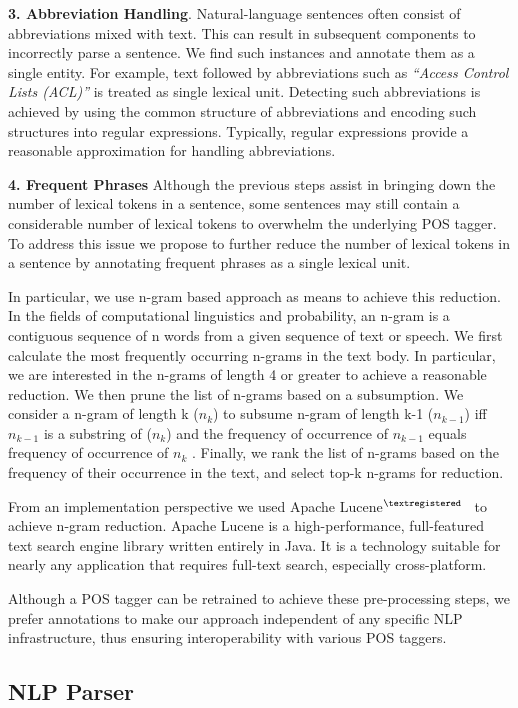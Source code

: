 \textbf{3. Abbreviation Handling}. Natural-language sentences often consist of abbreviations mixed with text. This can result in subsequent components to incorrectly parse a sentence. We find such instances and annotate them as a single entity. For example, text followed by abbreviations such as \textit{``Access Control Lists (ACL)''} is treated as single lexical unit. Detecting such abbreviations is achieved by using the common structure of abbreviations and encoding such structures into regular expressions. Typically, regular expressions provide a reasonable approximation for handling abbreviations. 
	
\textbf{4. Frequent Phrases} Although the previous steps assist in bringing down the number of lexical tokens in a sentence, some sentences may still contain a considerable number of lexical tokens to overwhelm the underlying POS tagger. To address this issue we propose to further reduce the number of lexical tokens in a sentence  by annotating frequent phrases as a single lexical unit.

In particular, we use n-gram based approach as means to achieve this reduction. In the fields of computational linguistics and probability, an n-gram is a contiguous sequence of n words from a given sequence of text or speech. We first calculate the most frequently occurring n-grams in the text body. In particular, we are interested in the n-grams of length 4 or greater to achieve a reasonable reduction. We then prune the list of n-grams based on a subsumption. We consider a n-gram of length k ($n_k$) to subsume n-gram of length k-1 ($n_{k-1}$) iff $n_{k-1}$ is a substring of ($n_k$) and the frequency of occurrence of $n_{k-1}$ equals frequency of occurrence of $n_{k}$ . Finally, we rank the list of n-grams based on the frequency of their occurrence in the text, and select top-k n-grams for reduction.
 
From an implementation perspective we used Apache Lucene$^{\textregistered}$~\cite{lucene} to achieve n-gram reduction. Apache Lucene is a high-performance, full-featured text search engine library written entirely in Java. It is a technology suitable for nearly any application that requires full-text search, especially cross-platform.

Although a POS tagger can be retrained to achieve these pre-processing steps, we prefer annotations to make our approach independent of any specific NLP infrastructure, thus ensuring interoperability with various POS taggers.
	
\subsection{NLP Parser}


